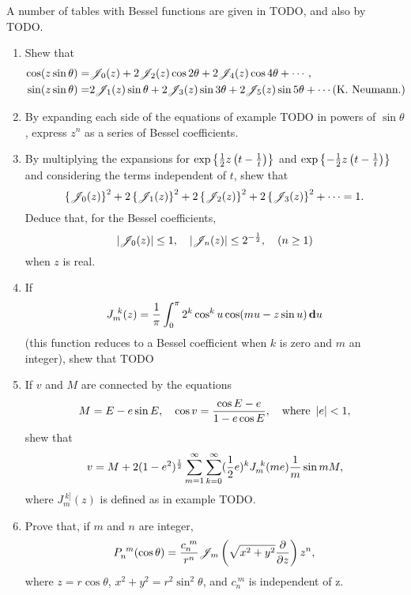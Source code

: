 A number of tables with Bessel functions are given in TODO, and also
by TODO.

%
%
\miscexamples
\begin{enumerate}
\item Shew that
  \begin{align*}
    \cos(z \sin\theta)
    =& \besJ_{0}(z) + 2 \besJ_{2}(z) \cos 2\theta + 2 \besJ_{4}(z)
    \cos 4\theta + \cdots,
    \\
    \sin(z\sin\theta)
    =& 2\besJ_{1}(z) \sin\theta + 2 \besJ_{3}(z)\sin 3\theta + 2
    \besJ_{5}(z) \sin 5\theta + \cdots
    \addexamplecitation{K. Neumann.}
  \end{align*}
\item
  By expanding each side of the equations of example TODO in powers of
  $\sin\theta$, express $z^{n}$ as a series of Bessel coefficients.
\item
  By multiplying the expansions for
  $\exp{ \left\{  \frac{1}{2} z\left( t - \frac{1}{t} \right)  \right\}  }$
  and
  $\exp{ \left\{ - \frac{1}{2} z\left( t - \frac{1}{t} \right)  \right\}  }$
  and considering the terms independent of $t$, shew that
  $$
  \left\{  \mathscr{J}_{0}(z)  \right\}^{2}
  + 2 \left\{  \mathscr{J}_{1}(z)  \right\}^{2}
  + 2 \left\{  \mathscr{J}_{2}(z)  \right\}^{2}
  + 2 \left\{  \mathscr{J}_{3}(z)  \right\}^{2}
  +
  \cdots
  =
  1.
  $$
  Deduce that, for the Bessel coefficients,
  $$
  \left| \mathscr{J}_{0}(z) \right| \leq 1,
  \quad
  \left| \mathscr{J}_{n}(z) \right| \leq 2^{-\frac{1}{2}},
  \quad
  (n \geq 1)
  $$
  when $z$ is real.
\item
  If
  $$
  J_{m}^{\ k}(z)
  =
  \frac{1}{\pi}
  \int_{0}^{\pi}
  2^{k}
  \cos^{k} u
  \cos (mu - z\sin u)
  \, \mathbf{d} u
  $$
  (this function reduces to a Bessel coefficient when $k$ is zero and
  $m$ an integer), shew that
  TODO
\item
  If $v$ and $M$ are connected by the equations
  $$
  M = E - e \sin E,
  \quad
  \cos v = \frac{\cos E - e}{1 - e\cos E},
  \quad
  \text{where } \left| e \right| < 1,
  $$
  shew that
  $$
  v
  =
  M
  +
  2 (1-e^{2})^{\frac{1}{2}}
  \sum_{m=1}^{\infty}
  \sum_{k=0}^{\infty}
  (\frac{1}{2} e)^{k}
  J_{m}^{\ k}(me)
  \frac{1}{m}
  \sin mM,
  $$
  where $J_{m}^{\ k]}(z)$ is defined as in example TODO.
%
%
\item
  Prove that, if $m$ and $n$ are integer,
  $$
  P_{n}^{\ m}(\cos\theta)
  =
  \frac{c_{n}^{\ m}}{r^{n}}
  \mathscr{J}_{m}
  \left(  \sqrt{x^{2}+y^{2}} \frac{\partial}{\partial z} \right)
  z^{n},
  $$
  where $z = r\cos\theta$, $x^{2} + y^{2} = r^{2} \sin^{2}\theta$, and
  $c_{n}^{\ m}$ is independent of z.

\end{enumerate}
